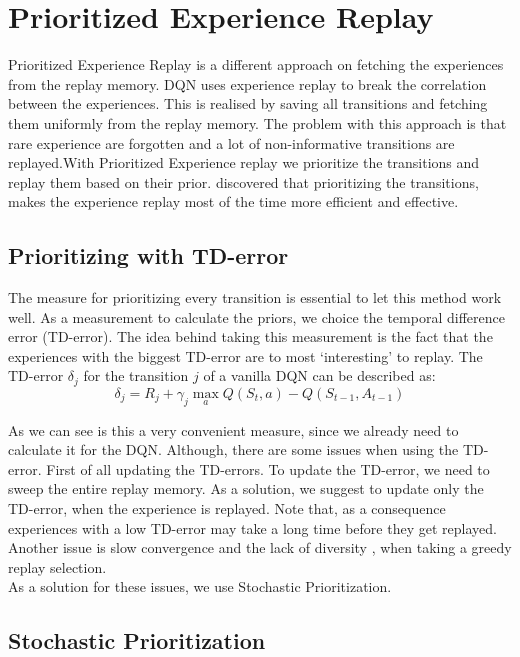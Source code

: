 \documentclass{sig-alternate}
\begin{document}
\section{Prioritized Experience Replay}\label{Prioritized Experience Replay}

Prioritized Experience Replay is a different approach on fetching the experiences from the replay memory. DQN uses experience replay to break the correlation between the experiences. This is realised by saving all transitions and fetching them uniformly from the replay memory. The problem with this approach is that rare experience are forgotten and a lot of non-informative transitions are replayed.With Prioritized Experience replay we prioritize the transitions  and replay them based on their prior. \cite{schaul2015prioritized} discovered that prioritizing the transitions, makes the experience replay most of the time more efficient and effective.  

\subsection{Prioritizing with TD-error}

The measure for prioritizing every transition is essential to let this method work well. As a measurement to calculate the priors, we choice the temporal difference error (TD-error). The idea behind taking this measurement is the fact that the experiences with the biggest TD-error are to most `interesting' to replay. The TD-error $\delta_{j}$ for the transition $j$ of a vanilla DQN can be described as: 
\begin{equation}
\label{Transitions}
\delta_{j} = R_{j} + \gamma_j \max_{a}Q(S_{t},a)-Q(S_{t-1},A_{t-1})
\end{equation}

As we can see is this a very convenient measure, since we already need to calculate it for the DQN. Although, there are some issues when using the TD-error. First of all updating the TD-errors. To update the TD-error, we need to sweep the entire replay memory. As a solution, we suggest to update only the TD-error, when the experience is replayed. Note that, as a consequence experiences with a low TD-error may take a long time before they get replayed. Another issue is slow convergence and the lack of diversity , when taking a greedy replay selection.\\
As a solution for these issues, we use Stochastic Prioritization. 
\subsection{Stochastic Prioritization}
\end{document}
